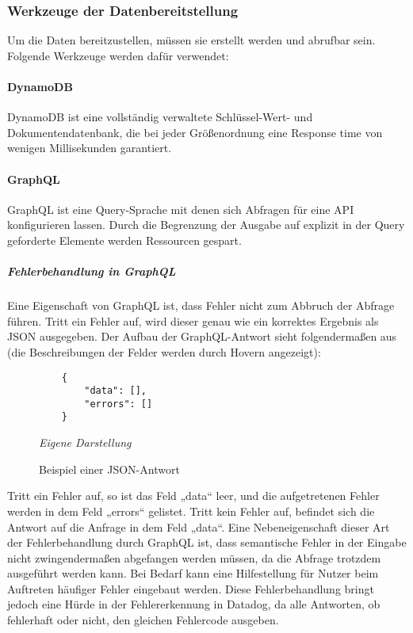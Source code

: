 \subsubsection{Werkzeuge der Datenbereitstellung}
Um die Daten bereitzustellen, müssen sie erstellt werden und abrufbar sein. Folgende Werkzeuge werden dafür verwendet:
\paragraph{DynamoDB} 
DynamoDB ist eine vollständig verwaltete Schlüssel-Wert- und Dokumentendatenbank, die bei jeder Größenordnung eine Response time von wenigen Millisekunden garantiert. \cite{AWS2024c}
\paragraph{GraphQL} 
GraphQL ist eine Query-Sprache mit denen sich Abfragen für eine API konfigurieren lassen. Durch die Begrenzung der Ausgabe auf explizit in der Query geforderte Elemente werden Ressourcen gespart. \cite{GraphQL2024}
\subparagraph{Fehlerbehandlung in GraphQL}
Eine Eigenschaft von GraphQL ist, dass Fehler nicht zum Abbruch der Abfrage führen. Tritt ein Fehler auf, wird dieser genau wie ein korrektes Ergebnis als JSON ausgegeben. \cite{GraphQL2024}\newline Der Aufbau der GraphQL-Antwort sieht folgendermaßen aus (die Beschreibungen der Felder werden durch Hovern angezeigt): 

	\begin{figure}[H]
	\centering
	\begin{minipage}[t]{.7\textwidth} %
	\caption{Beispiel einer JSON-Antwort} %
	\begin{verbatim}
	{
	    "data": [],
	    "errors": []
	}
	\end{verbatim}
	
	\textit{Eigene Darstellung} %
	\label{fig:jsonExample}
	\end{minipage}
	\end{figure}
 
Tritt ein Fehler auf, so ist das Feld „data“ leer, und die aufgetretenen Fehler werden in dem Feld „errors“ gelistet. Tritt kein Fehler auf, befindet sich die Antwort auf die Anfrage in dem Feld „data“. \cite{GraphQL2024b}\newline
Eine Nebeneigenschaft dieser Art der Fehlerbehandlung durch GraphQL ist, dass semantische Fehler in der Eingabe nicht zwingendermaßen abgefangen werden müssen, da die Abfrage trotzdem ausgeführt werden kann. Bei Bedarf kann eine Hilfestellung für Nutzer beim Auftreten häufiger Fehler eingebaut werden. 
Diese Fehlerbehandlung bringt jedoch eine Hürde in der Fehlererkennung in Datadog, da alle Antworten, ob fehlerhaft oder nicht, den gleichen Fehlercode ausgeben.
